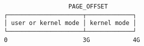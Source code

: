\documentclass[varwidth]{standalone}
\begin{document}
\begin{verbatim}
                  PAGE_OFFSET
┌─────────────────────┬─────────────┐
│ user or kernel mode │ kernel mode │
└─────────────────────┴─────────────┘
0                     3G            4G
\end{verbatim}
\end{document}
